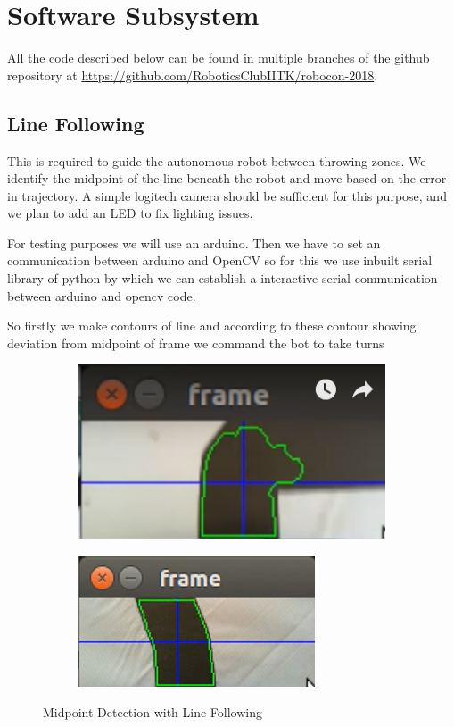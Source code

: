 \documentclass[11pt]{article}
\begin{document}
\pagebreak
\section{Software Subsystem}

All the code described below can be found in multiple branches of the github repository at \url{https://github.com/RoboticsClubIITK/robocon-2018}.

\subsection{Line Following}
This is required to guide the autonomous robot between throwing zones. We identify the midpoint of the line beneath the robot and move based on the error in trajectory. A simple logitech camera should be sufficient for this purpose, and we plan to add an LED to fix lighting issues.

For testing purposes we will use an arduino. Then we have to set an communication between arduino and OpenCV so for this we use inbuilt serial library of python by which we can establish a interactive serial communication between arduino and opencv code.

So firstly we make contours of line and according to these contour showing deviation from midpoint of frame we command the bot to take turns

    
\begin{figure}[!htb]
\centering
\begin{subfigure}{.5\textwidth}
  \centering
  \includegraphics[width=.8\linewidth]{line_follow1.png}
\end{subfigure}%
\begin{subfigure}{.5\textwidth}
  \centering
  \includegraphics[width=.8\linewidth]{line_follow2.png}
\end{subfigure}
\caption{Midpoint Detection with Line Following}
\label{fig:test}
\end{figure}
\end{document}
